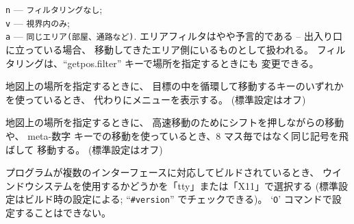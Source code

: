 {\tt n} --- \verb#フィルタリングなし#;\\
{\tt v} --- \verb#視界内のみ#;\\
{\tt a} --- \verb#同じエリア(部屋、通路など)#.
エリアフィルタはやや予言的である -- 出入り口に立っている場合、
移動してきたエリア側にいるものとして扱われる。
フィルタリングは、``getpos.filter'' キーで場所を指定するときにも
変更できる。
\item[\ib{whatis\verb+_+menu}]
地図上の場所を指定するときに、
目標の中を循環して移動するキーのいずれかを使っているとき、
代わりにメニューを表示する。
(標準設定はオフ)
\item[\ib{whatis\verb+_+moveskip}]
地図上の場所を指定するときに、
高速移動のためにシフトを押しながらの移動や、
meta-数字 キーでの移動を使っているとき、8 マス毎ではなく同じ記号を飛ばして
移動する。
(標準設定はオフ)
\item[\ib{windowtype}]
プログラムが複数のインターフェースに対応してビルドされているとき、
ウインドウシステムを使用するかどうかを「tty」または「X11」で選択する
(標準設定はビルド時の設定による; ``{\tt \#version}'' でチェックできる)。
`{\tt O}' コマンドで設定することはできない。

